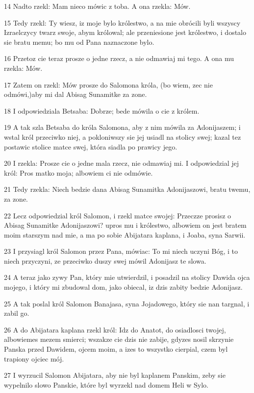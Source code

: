 \par 14 Nadto rzekl: Mam nieco mówic z toba. A ona rzekla: Mów.
\par 15 Tedy rzekl: Ty wiesz, iz moje bylo królestwo, a na mie obrócili byli wszyscy Izraelczycy twarz swoje, abym królowal; ale przeniesione jest królestwo, i dostalo sie bratu memu; bo mu od Pana naznaczone bylo.
\par 16 Przetoz cie teraz prosze o jedne rzecz, a nie odmawiaj mi tego. A ona mu rzekla: Mów.
\par 17 Zatem on rzekl: Mów prosze do Salomona króla, (bo wiem, zec nie odmówi,)aby mi dal Abisag Sunamitke za zone.
\par 18 I odpowiedziala Betsaba: Dobrze; bede mówila o cie z królem.
\par 19 A tak szla Betsaba do króla Salomona, aby z nim mówila za Adonijaszem; i wstal król przeciwko niej, a pokloniwszy sie jej usiadl na stolicy swej; kazal tez postawic stolice matce swej, która siadla po prawicy jego.
\par 20 I rzekla: Prosze cie o jedne mala rzecz, nie odmawiaj mi. I odpowiedzial jej król: Pros matko moja; albowiem ci nie odmówie.
\par 21 Tedy rzekla: Niech bedzie dana Abisag Sunamitka Adonijaszowi, bratu twemu, za zone.
\par 22 Lecz odpowiedzial król Salomon, i rzekl matce swojej: Przeczze prosisz o Abisag Sunamitke Adonijaszowi? upros mu i królestwo, albowiem on jest bratem moim starszym nad mie, a ma po sobie Abijatara kaplana, i Joaba, syna Sarwii.
\par 23 I przysiagl król Salomon przez Pana, mówiac: To mi niech uczyni Bóg, i to niech przyczyni, ze przeciwko duszy swej mówil Adonijasz te slowa.
\par 24 A teraz jako zywy Pan, który mie utwierdzil, i posadzil na stolicy Dawida ojca mojego, i który mi zbudowal dom, jako obiecal, iz dzis zabity bedzie Adonijasz.
\par 25 A tak poslal król Salomon Banajasa, syna Jojadowego, który sie nan targnal, i zabil go.
\par 26 A do Abijatara kaplana rzekl król: Idz do Anatot, do osiadlosci twojej, albowiemes mezem smierci; wszakze cie dzis nie zabije, gdyzes nosil skrzynie Panska przed Dawidem, ojcem moim, a izes to wszystko cierpial, czem byl trapiony ojciec mój.
\par 27 I wyrzucil Salomon Abijatara, aby nie byl kaplanem Panskim, zeby sie wypelnilo slowo Panskie, które byl wyrzekl nad domem Heli w Sylo.
